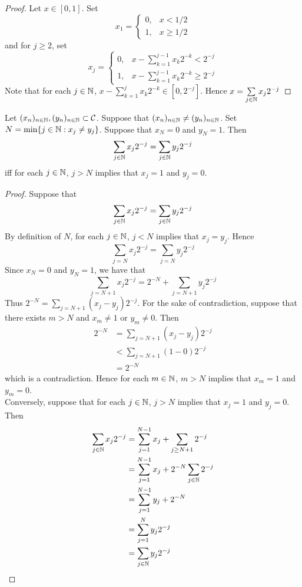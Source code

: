 \documentclass{book}
\begin{document}
	\begin{proof}
		Let $x \in [0,1]$. Set 
		$$x_1 = 
		\begin{cases}
			0, & x < 1/2 \\
			1, & x \geq 1/2 
		\end{cases}$$
		and for $j \geq 2$, set 
		$$x_j = \begin{cases}
			0, & x - \sum\limits_{k = 1}^{j-1}x_k2^{-k} < 2^{-j} \\
			1, & x - \sum\limits_{k = 1}^{j-1}x_k2^{-k} \geq 2^{-j} 
		\end{cases}$$
		Note that for each $j \in \mathbb{N}$, $x - \sum\limits_{k = 1}^{j}x_k2^{-k} \in [0, 2^{-j}]$. Hence $x = \sum\limits_{j \in \mathbb{N}} x_j2^{-j}$
	\end{proof}
	
	\begin{ex}  
		Let $(x_n)_{n \in \mathbb{N}}, (y_n)_{n \in \mathbb{N}} \subset \mathcal{C}$. Suppose that $(x_n)_{n \in \mathbb{N}} \neq (y_n)_{n \in \mathbb{N}}$. Set $N = \min\{j \in \mathbb{N}: x_j \neq y_j\}$. Suppose that $x_N = 0$ and $y_N = 1$. Then
		$$\sum\limits_{j \in \mathbb{N}} x_j 2^{-j} = \sum\limits_{j \in \mathbb{N}} y_j 2^{-j}$$ 
		iff for each $j \in \mathbb{N}$, $j > N$ implies that $x_j = 1$ and $y_j = 0$. 
	\end{ex}
	
	\begin{proof}
		Suppose that 
		$$\sum\limits_{j \in \mathbb{N}} x_j 2^{-j} = \sum\limits_{j \in \mathbb{N}} y_j 2^{-j}$$
		By definition of $N$, for each $j \in \mathbb{N}$, $j < N$ implies that $x_j = y_j$. Hence 
		$$\sum\limits_{j = N} x_j 2^{-j} = \sum\limits_{j = N} y_j 2^{-j}$$ 
		Since $x_N = 0$ and $y_N = 1$, we have that 
		$$\sum\limits_{j = N +1} x_j 2^{-j} = 2^{-N} + \sum\limits_{j = N+1} y_j 2^{-j}$$ 
		Thus $2^{-N} = \sum\limits_{j = N+1} (x_j - y_j) 2^{-j}$. For the sake of contradiction, suppose that there exists $m > N$ and $x_m \neq 1$ or $y_m \neq 0$. Then
		\begin{align*}
			2^{-N} 
			&= \sum\limits_{j = N+1} (x_j - y_j) 2^{-j} \\
			& < \sum\limits_{j = N+1} (1 - 0) 2^{-j} \\
			& = 2^{-N}
		\end{align*}
		which is a contradiction. Hence for each $m \in \mathbb{N}$, $m > N$ implies that $x_m = 1$ and $y_m = 0$. \vspace{.2cm}\\
		Conversely, suppose that for each $j \in \mathbb{N}$, $j > N$ implies that $x_j = 1$ and $y_j = 0$. Then 
		\begin{align*}
			\sum\limits_{j \in \mathbb{N}} x_j 2^{-j}
			& = \sum_{j=1}^{N-1} x_j + \sum_{j \geq N+1} 2^{-j} \\
			& = \sum_{j=1}^{N-1} x_j + 2^{-N} \sum_{j \in \mathbb{N}} 2^{-j} \\
			& = \sum_{j=1}^{N-1} y_j + 2^{-N} \\
			& = \sum_{j=1}^N y_j2^{-j} \\
			& = \sum\limits_{j \in \mathbb{N}} y_j 2^{-j}
		\end{align*}
	\end{proof}
	
\end{document}

